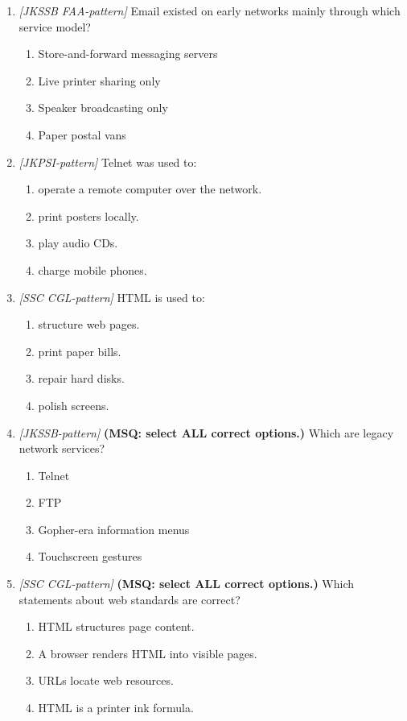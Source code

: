 \documentclass[11pt]{article}
\begin{document}
\begin{enumerate}[label=\textbf{Q\arabic*.}, leftmargin=*]
\item \textit{[JKSSB FAA-pattern]} Email existed on early networks mainly through which service model?
  \begin{enumerate}[label=\Alph*.]
    \item Store-and-forward messaging servers
    \item Live printer sharing only
    \item Speaker broadcasting only
    \item Paper postal vans
  \end{enumerate}
\item \textit{[JKPSI-pattern]} Telnet was used to:
  \begin{enumerate}[label=\Alph*.]
    \item operate a remote computer over the network.
    \item print posters locally.
    \item play audio CDs.
    \item charge mobile phones.
  \end{enumerate}
\item \textit{[SSC CGL-pattern]} HTML is used to:
  \begin{enumerate}[label=\Alph*.]
    \item structure web pages.
    \item print paper bills.
    \item repair hard disks.
    \item polish screens.
  \end{enumerate}
\item \textit{[JKSSB-pattern]} \textbf{(MSQ: select ALL correct options.)} Which are legacy network services?
  \begin{enumerate}[label=\Alph*.]
    \item Telnet
    \item FTP
    \item Gopher-era information menus
    \item Touchscreen gestures
  \end{enumerate}
\item \textit{[SSC CGL-pattern]} \textbf{(MSQ: select ALL correct options.)} Which statements about web standards are correct?
  \begin{enumerate}[label=\Alph*.]
    \item HTML structures page content.
    \item A browser renders HTML into visible pages.
    \item URLs locate web resources.
    \item HTML is a printer ink formula.
  \end{enumerate}
\end{enumerate}
\def\JKSSBLessonID{53}\def\JKSSBAnswers{0}
\end{document}
